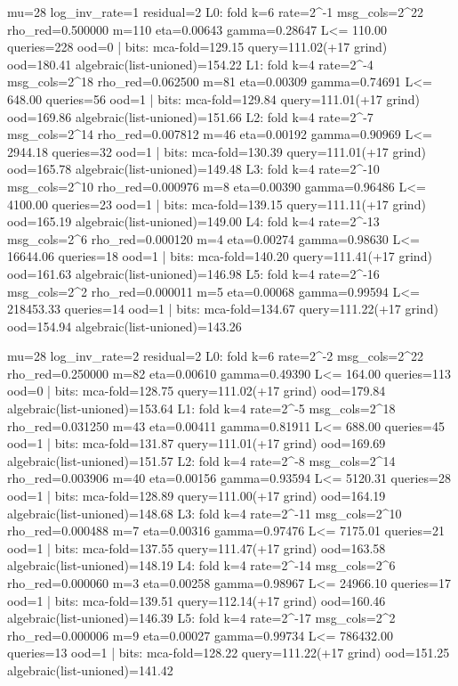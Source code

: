 \begin{shellcode}
mu=28 log_inv_rate=1 residual=2
  L0: fold k=6 rate=2^-1 msg_cols=2^22 rho_red=0.500000 m=110 eta=0.00643 gamma=0.28647 L<= 110.00 queries=228 ood=0 | bits: mca-fold=129.15 query=111.02(+17 grind) ood=180.41 algebraic(list-unioned)=154.22
  L1: fold k=4 rate=2^-4 msg_cols=2^18 rho_red=0.062500 m=81 eta=0.00309 gamma=0.74691 L<= 648.00 queries=56 ood=1 | bits: mca-fold=129.84 query=111.01(+17 grind) ood=169.86 algebraic(list-unioned)=151.66
  L2: fold k=4 rate=2^-7 msg_cols=2^14 rho_red=0.007812 m=46 eta=0.00192 gamma=0.90969 L<= 2944.18 queries=32 ood=1 | bits: mca-fold=130.39 query=111.01(+17 grind) ood=165.78 algebraic(list-unioned)=149.48
  L3: fold k=4 rate=2^-10 msg_cols=2^10 rho_red=0.000976 m=8 eta=0.00390 gamma=0.96486 L<= 4100.00 queries=23 ood=1 | bits: mca-fold=139.15 query=111.11(+17 grind) ood=165.19 algebraic(list-unioned)=149.00
  L4: fold k=4 rate=2^-13 msg_cols=2^6 rho_red=0.000120 m=4 eta=0.00274 gamma=0.98630 L<= 16644.06 queries=18 ood=1 | bits: mca-fold=140.20 query=111.41(+17 grind) ood=161.63 algebraic(list-unioned)=146.98
  L5: fold k=4 rate=2^-16 msg_cols=2^2 rho_red=0.000011 m=5 eta=0.00068 gamma=0.99594 L<= 218453.33 queries=14 ood=1 | bits: mca-fold=134.67 query=111.22(+17 grind) ood=154.94 algebraic(list-unioned)=143.26

mu=28 log_inv_rate=2 residual=2
  L0: fold k=6 rate=2^-2 msg_cols=2^22 rho_red=0.250000 m=82 eta=0.00610 gamma=0.49390 L<= 164.00 queries=113 ood=0 | bits: mca-fold=128.75 query=111.02(+17 grind) ood=179.84 algebraic(list-unioned)=153.64
  L1: fold k=4 rate=2^-5 msg_cols=2^18 rho_red=0.031250 m=43 eta=0.00411 gamma=0.81911 L<= 688.00 queries=45 ood=1 | bits: mca-fold=131.87 query=111.01(+17 grind) ood=169.69 algebraic(list-unioned)=151.57
  L2: fold k=4 rate=2^-8 msg_cols=2^14 rho_red=0.003906 m=40 eta=0.00156 gamma=0.93594 L<= 5120.31 queries=28 ood=1 | bits: mca-fold=128.89 query=111.00(+17 grind) ood=164.19 algebraic(list-unioned)=148.68
  L3: fold k=4 rate=2^-11 msg_cols=2^10 rho_red=0.000488 m=7 eta=0.00316 gamma=0.97476 L<= 7175.01 queries=21 ood=1 | bits: mca-fold=137.55 query=111.47(+17 grind) ood=163.58 algebraic(list-unioned)=148.19
  L4: fold k=4 rate=2^-14 msg_cols=2^6 rho_red=0.000060 m=3 eta=0.00258 gamma=0.98967 L<= 24966.10 queries=17 ood=1 | bits: mca-fold=139.51 query=112.14(+17 grind) ood=160.46 algebraic(list-unioned)=146.39
  L5: fold k=4 rate=2^-17 msg_cols=2^2 rho_red=0.000006 m=9 eta=0.00027 gamma=0.99734 L<= 786432.00 queries=13 ood=1 | bits: mca-fold=128.22 query=111.22(+17 grind) ood=151.25 algebraic(list-unioned)=141.42


\end{shellcode}
